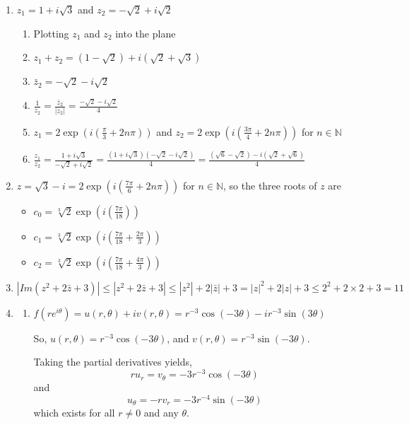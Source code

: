 \documentclass[12pt]{article}
\begin{document}
\begin{enumerate}
    \item $z_1 = 1 + i\sqrt3$ and $z_2 = -\sqrt2 + i\sqrt2$
    \begin{enumerate}
        \item Plotting $z_1$ and $z_2$ into the plane
        \item $z_1+z_2 = (1-\sqrt2) + i(\sqrt2 + \sqrt3)$
        \item $\bar z_2 = -\sqrt2 -i\sqrt2$
        \item $\frac{1}{z_2} = \frac{\bar z_2}{|z_2|} = \frac{-\sqrt2 - i\sqrt2}{4}$
        \item $z_1 = 2\exp(i(\frac{\pi}{3} + 2n\pi))$ and $z_2 = 2 \exp(i(\frac{3\pi}{4} + 2n\pi))$ for $n \in \mathbb{N}$
        \item $\frac{z_1}{z_2} = \frac{1+i\sqrt3}{-\sqrt2 + i\sqrt2} = \frac{(1+i\sqrt3)(-\sqrt2 - i\sqrt2)}{4} = \frac{( \sqrt6 - \sqrt2) -i(\sqrt2 + \sqrt6)}{4}$
    \end{enumerate}

    \item $z = \sqrt3 - i = 2\exp(i(\frac{7\pi}{6} + 2n\pi))$ for $n \in \mathbb{N}$, so the three roots of $z$ are 
    \begin{itemize}
        \item $c_0 = \sqrt[3]2 \exp(i(\frac{7\pi}{18}))$
        \item $c_1 =  \sqrt[3]2 \exp(i(\frac{7\pi}{18} + \frac{2\pi}{3}))$
        \item $c_2 =  \sqrt[3]2 \exp(i(\frac{7\pi}{18} + \frac{4\pi}{3}))$
    \end{itemize}

    \item 
    $|Im (z^2 + 2\bar z +3)| \le |z^2 + 2\bar z +3| \le |z^2| + 2|\bar z| + 3 = |z|^2 + 2|z| + 3 \le 2^2 + 2\times2 + 3 = 11$

    \item
    \begin{enumerate}
        \item $f(re^{i\theta}) = u(r, \theta) + iv(r, \theta) = r^{-3}\cos(-3\theta) - ir^{-3}\sin(3\theta)$

        So, $u(r, \theta)  = r^{-3}\cos(-3\theta)$, and $v(r, \theta) = r^{-3}\sin(-3\theta)$. 

        Taking the partial derivatives yields, $$r u_r = v_\theta = -3r^{-3}\cos(-3\theta)$$ and $$u_\theta = -r v_r = -3r^{-4}\sin(-3\theta)$$ which exists for all $r \not = 0$ and any $\theta$.
        

\end{enumerate}
\end{enumerate}
\end{document}
